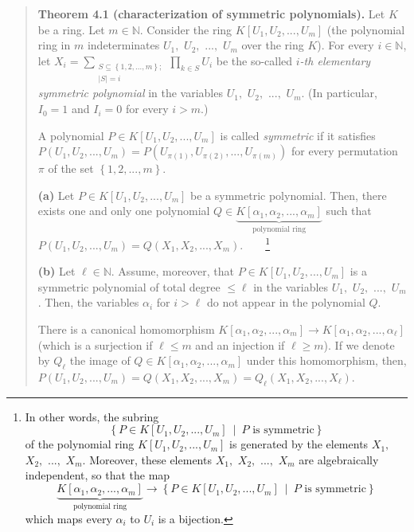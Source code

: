 \documentclass[12pt,final,notitlepage,onecolumn,german]{article}%
\begin{document}
\begin{quote}
\textbf{Theorem 4.1 (characterization of symmetric polynomials).} Let $K$ be a
ring. Let $m\in\mathbb{N}$. Consider the ring $K\left[  U_{1},U_{2}%
,...,U_{m}\right]  $ (the polynomial ring in $m$ indeterminates $U_{1},$
$U_{2},$ $...,$ $U_{m}$ over the ring $K$). For every $i\in\mathbb{N}$, let
$X_{i}=\sum\limits_{\substack{S\subseteq\left\{  1,2,...,m\right\}
;\\\left\vert S\right\vert =i}}\prod\limits_{k\in S}U_{i}$ be the so-called
$i$\textit{-th elementary symmetric polynomial} in the variables $U_{1},$
$U_{2},$ $...,$ $U_{m}$. (In particular, $I_{0}=1$ and $I_{i}=0$ for every
$i>m$.)

A polynomial $P\in K\left[  U_{1},U_{2},...,U_{m}\right]  $ is called
\textit{symmetric} if it satisfies $P\left(  U_{1},U_{2},...,U_{m}\right)
=P\left(  U_{\pi\left(  1\right)  },U_{\pi\left(  2\right)  },...,U_{\pi
\left(  m\right)  }\right)  $ for every permutation $\pi$ of the set $\left\{
1,2,...,m\right\}  $.

\textbf{(a)} Let $P\in K\left[  U_{1},U_{2},...,U_{m}\right]  $ be a symmetric
polynomial. Then, there exists one and only one polynomial $Q\in
\underbrace{K\left[  \alpha_{1},\alpha_{2},...,\alpha_{m}\right]
}_{\text{polynomial ring}}$ such that $P\left(  U_{1},U_{2},...,U_{m}\right)
=Q\left(  X_{1},X_{2},...,X_{m}\right)  $.\ \ \ \ \footnote{In other words,
the subring%
\[
\left\{  P\in K\left[  U_{1},U_{2},...,U_{m}\right]  \ \mid\ P\text{ is
symmetric}\right\}
\]
of the polynomial ring $K\left[  U_{1},U_{2},...,U_{m}\right]  $ is generated
by the elements $X_{1},$ $X_{2},$ $...,$ $X_{m}$. Moreover, these elements
$X_{1},$ $X_{2},$ $...,$ $X_{m}$ are algebraically independent, so that the
map%
\[
\underbrace{K\left[  \alpha_{1},\alpha_{2},...,\alpha_{m}\right]
}_{\text{polynomial ring}}\rightarrow\left\{  P\in K\left[  U_{1}%
,U_{2},...,U_{m}\right]  \ \mid\ P\text{ is symmetric}\right\}
\]
which maps every $\alpha_{i}$ to $U_{i}$ is a bijection.}

\textbf{(b)} Let $\ell\in\mathbb{N}$. Assume, moreover, that $P\in K\left[
U_{1},U_{2},...,U_{m}\right]  $ is a symmetric polynomial of total degree
$\leq\ell$ in the variables $U_{1},$ $U_{2},$ $...,$ $U_{m}$. Then, the
variables $\alpha_{i}$ for $i>\ell$ do not appear in the polynomial $Q$.

There is a canonical homomorphism $K\left[  \alpha_{1},\alpha_{2}%
,...,\alpha_{m}\right]  \rightarrow K\left[  \alpha_{1},\alpha_{2}%
,...,\alpha_{\ell}\right]  $ (which is a surjection if $\ell\leq m$ and an
injection if $\ell\geq m$). If we denote by $Q_{\ell}$ the image of $Q\in
K\left[  \alpha_{1},\alpha_{2},...,\alpha_{m}\right]  $ under this
homomorphism, then, $P\left(  U_{1},U_{2},...,U_{m}\right)  =Q\left(
X_{1},X_{2},...,X_{m}\right)  =Q_{\ell}\left(  X_{1},X_{2},...,X_{\ell
}\right)  $.
\end{quote}
\end{document}
